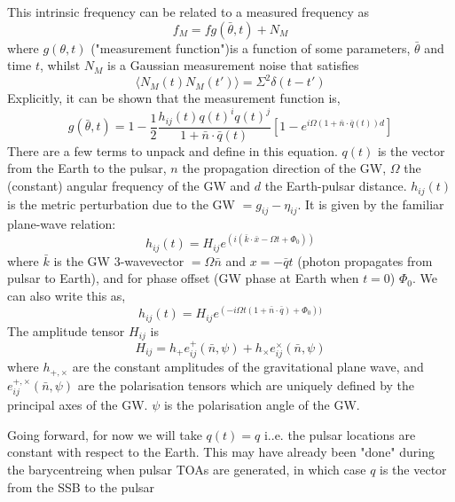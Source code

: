 \documentclass[fleqn,usenatbib,useAMS]{mnras}
\begin{document}
This intrinsic frequency can be related to a measured frequency as 
\begin{equation}
	f_M = f g(\bar{\theta},t) + N_M
\end{equation}
where $g(\theta,t)$ ("measurement function")is a function of some parameters, $\bar{\theta}$ and time $t$, whilst $N_M$ is a Gaussian measurement noise that satisfies 
\begin{equation}
	\langle N_M(t) N_M(t') \rangle = \Sigma^2 \delta(t - t')
\end{equation}
Explicitly, it can be shown that the measurement function is,
\begin{equation} \label{eq:final}
	g(\bar{\theta},t) = 1 - \frac{1}{2} \frac{h_{ij}(t) q(t)^i q(t)^j}{1 + \bar{n} \cdot \bar{q}(t)}[1 - e^{i \Omega(1+\bar{n} \cdot \bar{q}(t)) d}]
\end{equation}
There are a few terms to unpack and define in this equation. $q(t)$ is the vector from the Earth to the pulsar, $n$ the propagation direction of the GW, $\Omega$ the (constant) angular frequency of the GW and $d$ the Earth-pulsar distance. $h_{ij}(t)$ is the metric perturbation due to the GW $= g_{ij} - \eta_{ij}$. It is given by the familiar plane-wave relation:	
\begin{equation}
	h_{ij}(t) = H_{ij} e^{(i(\bar{k} \cdot \bar{x} - \Omega t + \Phi_0))}
\end{equation}
where $\bar{k}$ is the GW 3-wavevector $=\Omega \bar{n}$ and $x = -\bar{q} t$ (photon propagates from pulsar to Earth), and for phase offset (GW phase at Earth when $t=0$) $\Phi_0$.  We can also write this as,
\begin{equation}
h_{ij}(t) = H_{ij} e^{(-i\Omega t (1 + \bar{n} \cdot \bar{q} ) + \Phi_0))}
\end{equation}
The amplitude tensor  $H_{ij}$ is
\begin{equation}
	H_{ij} = h_+ e_{ij}^+(\bar{n},\psi) + h_{\times} e_{ij}^{\times}(\bar{n},\psi)
\end{equation}
where $h_{+,\times}$ are the constant amplitudes of the gravitational plane wave, and $e_{ij}^{+, \times}(\bar{n}, \psi)$ are the polarisation tensors which are uniquely defined by the principal axes of the GW. $\psi$ is the polarisation angle of the GW. \newline 








\noindent Going forward, for now we will take $q(t) = q$ i..e. the pulsar locations are constant with respect to the Earth. This may have already been "done" during the barycentreing when pulsar TOAs are generated, in which case $q$ is the vector from the SSB to the pulsar  \newline 
\end{document}
